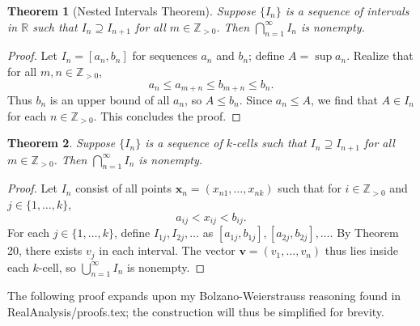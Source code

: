 \documentclass[11pt]{article}
\renewcommand{\vec}[1]{\mathbf{#1}}
\newtheorem{theorem}{Theorem}
\begin{document}
\begin{theorem}[Nested Intervals Theorem]
	Suppose $\{ I_{n} \}$ is a sequence of intervals in $\mathbb{R}$ such that $I_{n} \supseteq I_{n + 1}$ for all $m \in \mathbb{Z}_{> 0}$. Then $\bigcap_{n = 1}^{\infty} I_{n}$ is nonempty.
\end{theorem}
\begin{adjustwidth}{1cm}{}
	\begin{proof}
		Let $I_{n} = [a_{n}, b_{n}]$ for sequences $a_{n}$ and $b_{n}$; define $A = \sup a_{n}$. Realize that for all $m, n \in \mathbb{Z}_{> 0}$,
		\[
			a_{n} \le a_{m + n} \le b_{m + n} \le b_{n}.
		\]
		Thus $b_{n}$ is an upper bound of all $a_{n}$, so $A \le b_{n}$. Since $a_{n} \le A$, we find that $A \in I_{n}$ for each $n \in \mathbb{Z}_{> 0}$. This concludes the proof.
	\end{proof}
\end{adjustwidth}

\begin{theorem}
	Suppose $\{ I_{n} \}$ is a sequence of $k$-cells such that $I_{n} \supseteq I_{n + 1}$ for all $m \in \mathbb{Z}_{> 0}$. Then $\bigcap_{n = 1}^{\infty} I_{n}$ is nonempty.
\end{theorem}
\begin{adjustwidth}{1cm}{}
	\begin{proof}
		Let $I_{n}$ consist of all points $\vec{x}_{n} = (x_{n1}, \ldots, x_{nk})$ such that for $i \in \mathbb{Z}_{> 0}$ and $j \in \{ 1, \ldots, k \}$,
		\[
			a_{ij} < x_{ij} < b_{ij}.
		\]
		For each $j \in \{ 1, \ldots, k \}$, define $I_{1j}, I_{2j}, \ldots$ as $[a_{1j}, b_{1j}], [a_{2j}, b_{2j}], \ldots$. By Theorem 20, there exists $v_{j}$ in each interval. The vector $\vec{v} = (v_{1}, \ldots, v_{n})$ thus lies inside each $k$-cell, so $\bigcup_{n = 1}^{\infty} I_{n}$ is nonempty.
	\end{proof}
\end{adjustwidth}

The following proof expands upon my Bolzano-Weierstrauss reasoning found in RealAnalysis/proofs.tex; the construction will thus be simplified for brevity.
\end{document}

